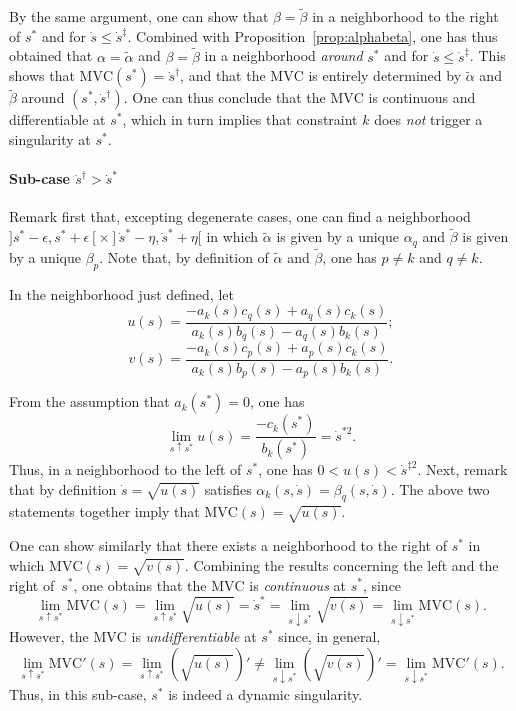\documentclass[9pt,technote]{IEEEtran}
\newcommand{\MVC}{\mathrm{MVC}}
\begin{document}
By the same argument, one can show that $\beta = \tilde{\beta}$ in a
neighborhood to the right of $s^*$ and for $\dot s \leq \dot
s^\ddag{}$. Combined with Proposition~\ref{prop:alphabeta}, one has
thus obtained that $\alpha = \tilde{\alpha}$ and $\beta =
\tilde{\beta}$ in a neighborhood \emph{around} $s^*$ and for $\dot s
\leq \dot s^\ddag{}$. This shows that $\MVC(s^*) =\dot{s}^\dag$, and
that the $\MVC$ is entirely determined by $\tilde{\alpha}$ and
$\tilde{\beta}$ around $(s^*,\dot{s}^\dag)$. One can thus conclude
that the $\MVC$ is continuous and differentiable at $s^*$, which in
turn implies that constraint $k$ does \emph{not} trigger a singularity
at $s^*$.

\paragraph{Sub-case $\dot{s}^\dag{}>\dot s^*$}

Remark first that, excepting degenerate cases, one can find a
neighborhood $]s^*-\epsilon,s^*+\epsilon[\times ] \dot s^*-\eta, \dot
s^*+\eta[$ in which $\tilde{\alpha}$ is given by a unique $\alpha_q$
and $\tilde{\beta}$ is given by a unique $\beta_p$. Note that, by
definition of $\tilde{\alpha}$ and $\tilde{\beta}$, one has $p\neq k$
and $q\neq k$.

In the neighborhood just defined, let
\[
u(s)=\frac{-a_k(s)c_q(s) + a_q(s)c_k(s)}{a_k(s)b_q(s)-a_q(s)b_k(s)};
\]
\[
v(s)=\frac{-a_k(s)c_p(s)+a_p(s)c_k(s)}{a_k(s)b_p(s)-a_p(s)b_k(s)}.
\]

From the assumption that $a_k(s^*)=0$, one has
\[
\lim_{s\uparrow s^*} u(s)=\frac{-c_k(s^*)}{b_k(s^*)}=\dot{s}^{*2}.
\]
Thus, in a neighborhood to the left of $s^*$, one has $0<u(s)<\dot
s^{\ddag{}2}$.  Next, remark that by definition $\dot s=\sqrt{u(s)}$
satisfies $\alpha_k(s,\dot s)=\beta_q(s,\dot s)$. The above two
statements together imply that $\MVC(s) = \sqrt{u(s)}$.

One can show similarly that there exists a neighborhood to the right
of $s^*$ in which $\MVC(s)=\sqrt{v(s)}$. Combining the results
concerning the left and the right of~$s^*$, one obtains that the
$\MVC$ is \emph{continuous} at $s^*$, since
\[
\lim_{s\uparrow s^*} \MVC(s) = \lim_{s\uparrow s^*} \sqrt{u(s)} = 
\dot s^* = \lim_{s\downarrow s^*} \sqrt{v(s)} = \lim_{s\downarrow s^*} \MVC(s) . 
\]
%
However, the $\MVC$ is \emph{undifferentiable} at $s^*$ since, in
general,
\[
\lim_{s\uparrow s^*} \MVC'(s) = \lim_{s\uparrow s^*}
\left(\sqrt{u(s)}\right)' \neq 
\lim_{s\downarrow s^*} \left(\sqrt{v(s)}\right)' = \lim_{s\downarrow s^*} \MVC'(s) .
\]
%
Thus, in this sub-case, $s^*$ is indeed a dynamic singularity.
\end{document}
